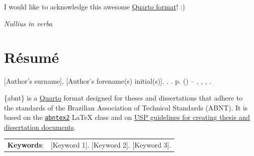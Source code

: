 \documentclass[
12pt,
openright,
oneside,
a4paper,
chapter=TITLE,
section=TITLE,
french,
spanish,
brazil,
english
]{abntex2}\usepackage{array}
\makeatletter
\renewcommand{\agradecimentosname}{Acknowledgements}
\renewcommand{\epigraphname}{Epigraph}
\renewcommand{\resumoname}{Abstract}
\renewcommand{\agradecimentosname}{Agradecimentos}
\renewcommand{\epigraphname}{Epígrafe}
\renewcommand{\resumoname}{Resumo}
\renewcommand{\agradecimentosname}{Agradecimientos}
\renewcommand{\epigraphname}{Epígrafe}
\renewcommand{\resumoname}{Resumen}
\renewcommand{\epigraphname}{Épigraphe}
\renewcommand{\resumoname}{Résumé}
\providecommand{\imprimiruniversidade}{}
\providecommand{\imprimirescola}{}
\providecommand{\imprimirtituloacademico}{}
\renewcommand{\pretextualchapter}[1]{
  \addtocounter{abntex@bookmarkcounter}{1}
  \PRIVATEbookmarkthis{#1}
  \chapter*[#1]{#1}
}
\newenvironment{resumoenv}[1][\resumoname]{
  \pretextualchapter{#1}
  \begingroup
  \setlength{\parindent}{0cm}
  \setlength{\parskip}{\smallskipamount} %
  \AtBeginEnvironment{tabular}{\normalsize}
  \renewcommand{\arraystretch}{1}
  \setlength{\aboverulesep}{0ex}
  \setlength{\belowrulesep}{0ex}
  \setlength{\arrayrulewidth}{0pt}
  \setlength{\tabcolsep}{0cm}
  \vspace{-\smallskipamount} %
  \begin{SingleSpace}
}{
  \end{SingleSpace}
  \cleardoublepage
  \endgroup
}
\theoremstyle{plain}
\theoremstyle{remark}
\makeatother
\begin{document}

\begin{agradecimentos}[\agradecimentosname]

I would like to acknowledge this awesome
\href{https://github.com/danielvartan/abnt}{Quarto format}! :)

\end{agradecimentos}


\begin{epigrafe}[] %
\vspace*{\fill} %
\begin{flushright}
\textit{Nullius in verba}\footnotemark{}

\end{flushright}
\end{epigrafe}


\begin{resumoenv}[\resumoname]
[Author's surname], [Author's forename(s) initial(s)]. \textbf{\imprimirtitulo}. {\imprimirdata}. {\thelastpage}p. {\imprimirtipotrabalho}  (\imprimirtituloacademico) -- {\imprimirescola}, {\imprimiruniversidade}, {\imprimirlocal}, {\imprimirdata}.


\{abnt\} is a \href{https://quarto.org}{Quarto} format designed for
theses and dissertations that adhere to the standards of the Brazilian
Association of Technical Standards (ABNT). It is based on the
\href{https://www.abntex.net.br/}{\texttt{abntex2}} LaTeX class and on
\href{https://teses.usp.br/index.php?option=com_content&view=article&id=52&Itemid=67&lang=en}{USP
guidelines for creating thesis and dissertation documents}.


\begin{tabular}{p{2.3cm} p{13.6cm}}
  \textbf{Keywords}: &  [Keyword 1]. [Keyword 2]. [Keyword 3].
\end{tabular}
\end{resumoenv}
\end{document}
